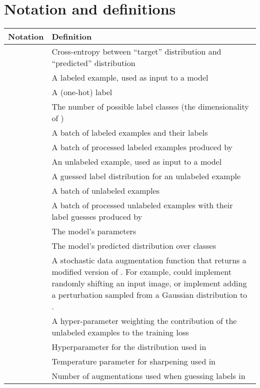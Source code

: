 \documentclass{article}
\begin{document}



\appendix

\newpage
\section{Notation and definitions}
{\footnotesize 
\begin{tabular}{p{1in}p{4in}}
\toprule
\textbf{Notation} & \textbf{Definition} \\
\midrule
 & Cross-entropy between ``target'' distribution  and ``predicted'' distribution \\
\midrule
 & A labeled example, used as input to a model \\
\midrule
 & A (one-hot) label\\
\midrule
 & The number of possible label classes (the dimensionality of ) \\
\midrule
 & A batch of labeled examples and their labels \\
\midrule
 & A batch of processed labeled examples produced by  \\
\midrule
 & An unlabeled example, used as input to a model \\
\midrule
 & A guessed label distribution for an unlabeled example \\
\midrule
 & A batch of unlabeled examples \\
\midrule
 & A batch of processed unlabeled examples with their label guesses produced by  \\
\midrule
 & The model's parameters \\
\midrule
 & The model's predicted distribution over classes \\
\midrule
 &  A stochastic data augmentation function that returns a modified version of . For example,  could implement randomly shifting an input image, or implement adding a perturbation sampled from a Gaussian distribution to .\\
\midrule
 & A hyper-parameter weighting the contribution of the unlabeled examples to the training loss\\
\midrule
 & Hyperparameter for the  distribution used in  \\
\midrule
 & Temperature parameter for sharpening used in  \\
\midrule
 & Number of augmentations used when guessing labels in  \\
\midrule
\end{tabular}
}

\newpage
\end{document}
